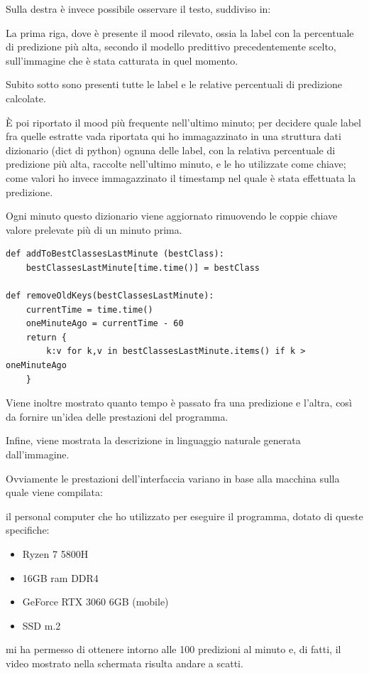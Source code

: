 Sulla destra è invece possibile osservare il testo, suddiviso in:

La prima riga, dove è presente il mood rilevato, ossia la label con la percentuale di predizione più alta, secondo il modello predittivo precedentemente scelto, sull’immagine che è stata catturata in quel momento.

Subito sotto sono presenti tutte le label e le relative percentuali di predizione calcolate.

È poi riportato il mood più frequente nell’ultimo minuto; per decidere quale label fra quelle estratte vada riportata qui ho immagazzinato in una struttura dati dizionario (dict di python) ognuna delle label, con la relativa percentuale di predizione più alta, raccolte nell’ultimo minuto, e le ho utilizzate come chiave; come valori ho invece immagazzinato il timestamp nel quale è stata effettuata la predizione.

Ogni minuto questo dizionario viene aggiornato rimuovendo le coppie chiave valore prelevate più di un minuto prima. 
\begin{verbatim}
def addToBestClassesLastMinute (bestClass):
    bestClassesLastMinute[time.time()] = bestClass

def removeOldKeys(bestClassesLastMinute):
    currentTime = time.time()
    oneMinuteAgo = currentTime - 60
    return {
        k:v for k,v in bestClassesLastMinute.items() if k > oneMinuteAgo
    }
\end{verbatim}
Viene inoltre mostrato quanto tempo è passato fra una predizione e l’altra, così da fornire un’idea delle prestazioni del programma.

Infine, viene mostrata la descrizione in linguaggio naturale generata dall'immagine.

Ovviamente le prestazioni dell’interfaccia variano in base alla macchina sulla quale viene compilata:

il personal computer che ho utilizzato per eseguire il programma, dotato di queste specifiche:
\begin{itemize}
    \item Ryzen 7 5800H
    \item 16GB ram DDR4
    \item GeForce RTX 3060 6GB (mobile)
    \item SSD m.2
\end{itemize}

mi ha permesso di ottenere intorno alle 100 predizioni al minuto e, di fatti, il video mostrato nella schermata risulta andare a scatti.

